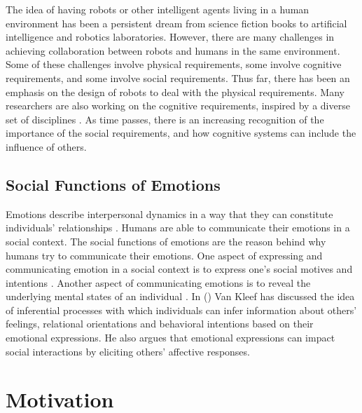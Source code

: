 \documentclass[letterpaper]{article}
\begin{document}
The idea of having robots or other intelligent agents living in a human
environment has been a persistent dream from science fiction books to artificial
intelligence and robotics laboratories. However, there are many challenges in
achieving collaboration between robots and humans in the same environment. Some
of these challenges involve physical requirements, some involve cognitive
requirements, and some involve social requirements. Thus far, there has been an
emphasis on the design of robots to deal with the physical requirements. Many
researchers are also working on the cognitive requirements, inspired by a
diverse set of disciplines
\cite{laird:soar,scheutz:integration-cognition,hemion:cognition-building-blocks}.
As time passes, there is an increasing recognition of the importance of the social
requirements, and how cognitive systems can include the influence of others.

\vspace*{-2mm}
\subsection{Social Functions of Emotions}

Emotions describe interpersonal dynamics in a way that they can constitute
individuals' relationships \cite{parkinson:emotions-social,tiedens:social-life}.
Humans are able to communicate their emotions in a social context. The social
functions of emotions are the reason behind why humans try to communicate their
emotions. One aspect of expressing
and communicating emotion in a social context is to express one's social motives
and intentions \cite{hess:darwin-emotion}. Another aspect of communicating
emotions is to reveal the underlying mental states of an individual
\cite{parkinson:emotion-communication}. In
(\citeyear{kleef:emotion-regulate-social}) Van Kleef has discussed the idea of
inferential processes with which individuals can infer information about others'
feelings, relational orientations and behavioral intentions based on their
emotional expressions. He also argues that emotional expressions can impact
social interactions by eliciting others' affective responses.

\vspace*{-3mm}
\section{Motivation}
\end{document}
